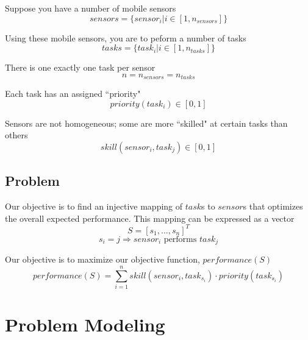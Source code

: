 \documentclass[a4paper]{article}
\begin{document}
Suppose you have a number of mobile sensors
$$\mathit{sensors} = \{ \mathit{sensor}_i | i \in [1, n_\mathit{sensors}] \}$$

Using these mobile sensors, you are to peform a number of tasks
$$\mathit{tasks} = \{ \mathit{task}_i | i \in [1, n_\mathit{tasks}] \}$$

There is one exactly one task per sensor
$$n = n_\mathit{sensors} = n_\mathit{tasks}$$

Each task has an assigned ``priority"
$$\mathit{priority}(\mathit{task}_i) \in [0 ,1]$$

Sensors are not homogeneous; some are more ``skilled" at certain tasks than others
$$\mathit{skill}(\mathit{sensor}_i, \mathit{task}_j) \in [0 ,1]$$

\subsection{Problem}

Our objective is to find an injective mapping of $\mathit{task}$s to $\mathit{sensor}$s that optimizes the overall expected performance. This mapping can be expressed as a vector
$$S = [s_1, ..., s_n]^T$$
$$s_i = j \Rightarrow \mathit{sensor}_i \text{ performs } \mathit{task}_j$$

Our objective is to maximize our objective function, $\mathit{performance}(S)$
$$\mathit{performance}(S) = \sum_{i=1}^n \mathit{skill}(\mathit{sensor}_i, \mathit{task}_{s_i}) \cdot \mathit{priority}(\mathit{task}_{s_i})$$


\section{Problem Modeling}

\end{document}
